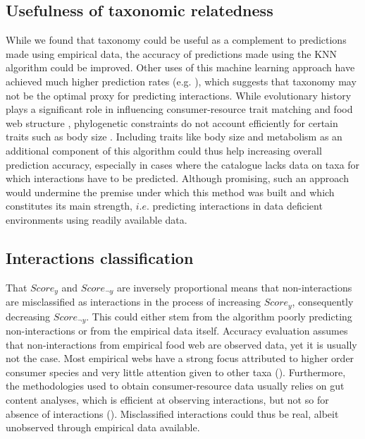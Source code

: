 \documentclass[letterpaper]{article}
\begin{document}
\subsection{Usefulness of taxonomic relatedness}
 While we found that taxonomy could be useful as a complement to predictions made using empirical data, the accuracy of predictions made using the KNN algorithm could be improved. Other uses of this machine learning approach have achieved much higher prediction rates (e.g. \cite{?}), which suggests that taxonomy may not be the optimal proxy for predicting interactions. While evolutionary history plays a significant role in influencing consumer-resource trait matching and food web structure \citep{Mouquet2012, Rohr2014}, phylogenetic constraints do not account efficiently for certain traits such as body size \citep{Eklof2016}. Including traits like body size and metabolism as an additional component of this algorithm could thus help increasing overall prediction accuracy, especially in cases where the catalogue lacks data on taxa for which interactions have to be predicted. Although promising, such an approach would undermine the premise under which this method was built and which constitutes its main strength, $i.e.$ predicting interactions in data deficient environments using readily available data.

\subsection{Interactions classification}
That $Score_{y}$ and $Score_{\neg y}$ are inversely proportional means that non-interactions are misclassified as interactions in the process of increasing $Score_y$, consequently decreasing $Score_{\neg y}$. This could either stem from the algorithm poorly predicting non-interactions or from the empirical data itself. Accuracy evaluation assumes that non-interactions from empirical food web are observed data, yet it is usually not the case. Most empirical webs have a strong focus attributed to higher order consumer species and very little attention given to other taxa (\cite{?}). Furthermore, the methodologies used to obtain consumer-resource data usually relies on gut content analyses, which is efficient at observing interactions, but not so for absence of interactions (\cite{?}). Misclassified interactions could thus be real, albeit unobserved through empirical data available.
\end{document}
